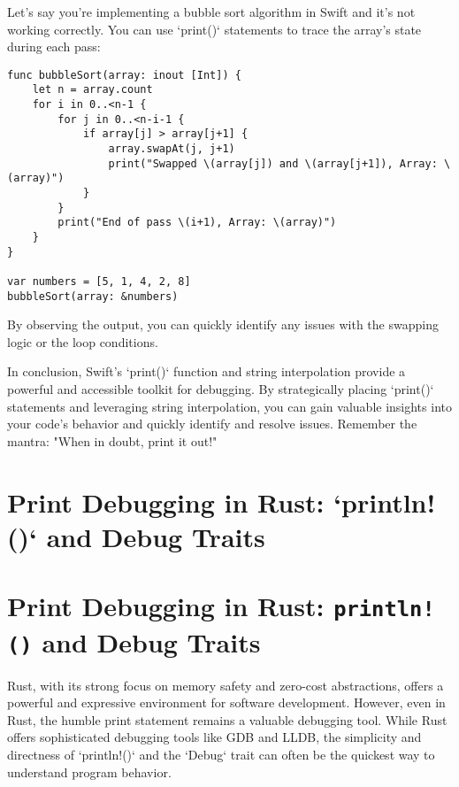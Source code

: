 \documentclass{article}
\begin{document}
{{{{Let's say you're implementing a bubble sort algorithm in Swift and it's not working correctly.  You can use `print()` statements to trace the array's state during each pass:

\begin{verbatim}
func bubbleSort(array: inout [Int]) {
    let n = array.count
    for i in 0..<n-1 {
        for j in 0..<n-i-1 {
            if array[j] > array[j+1] {
                array.swapAt(j, j+1)
                print("Swapped \(array[j]) and \(array[j+1]), Array: \(array)")
            }
        }
        print("End of pass \(i+1), Array: \(array)")
    }
}

var numbers = [5, 1, 4, 2, 8]
bubbleSort(array: &numbers)
\end{verbatim}

By observing the output, you can quickly identify any issues with the swapping logic or the loop conditions.

In conclusion, Swift's `print()` function and string interpolation provide a powerful and accessible toolkit for debugging.  By strategically placing `print()` statements and leveraging string interpolation, you can gain valuable insights into your code's behavior and quickly identify and resolve issues.  Remember the mantra: "When in doubt, print it out!"

\newpage

\section*{Print Debugging in Rust: `println!()` and Debug Traits} %
\label{chapter-9-10-Print_Debugging_in_Rust___println_____an}

\section*{Print Debugging in Rust: \texttt{println!()} and Debug Traits}

Rust, with its strong focus on memory safety and zero-cost abstractions, offers a powerful and expressive environment for software development. However, even in Rust, the humble print statement remains a valuable debugging tool. While Rust offers sophisticated debugging tools like GDB and LLDB, the simplicity and directness of `println!()` and the `Debug` trait can often be the quickest way to understand program behavior.

}}}}
\end{document}
